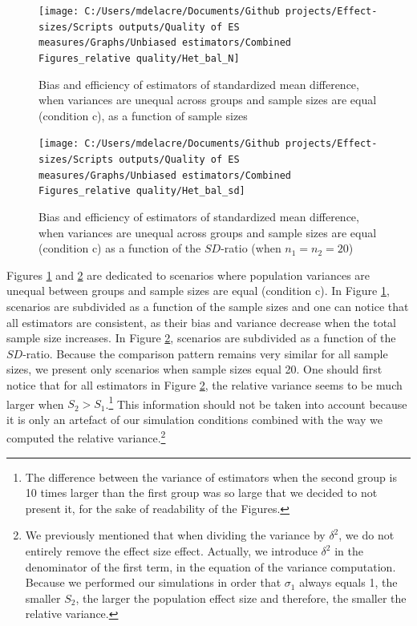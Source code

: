 \documentclass[
  english,
  man,floatsintext]{apa6}
\begin{document}
\begin{landscape}
\newpage

\begin{figure}

{\centering \texttt{[image: C:/Users/mdelacre/Documents/Github projects/Effect-sizes/Scripts outputs/Quality of ES measures/Graphs/Unbiased estimators/Combined Figures\_relative quality/Het\_bal\_N]} 

}

\caption{Bias and efficiency of estimators of standardized mean difference, when variances are unequal across groups and sample sizes are equal (condition c), as a function of sample sizes}\label{fig:idHetbal1}
\end{figure}

\end{landscape}
\newpage
\begin{landscape}

\begin{figure}

{\centering \texttt{[image: C:/Users/mdelacre/Documents/Github projects/Effect-sizes/Scripts outputs/Quality of ES measures/Graphs/Unbiased estimators/Combined Figures\_relative quality/Het\_bal\_sd]} 

}

\caption{Bias and efficiency of estimators of standardized mean difference, when variances are unequal across groups and sample sizes are equal (condition c) as a function of the $SD$-ratio (when $n_1=n_2=20$)}\label{fig:idHetbal2}
\end{figure}

\end{landscape}
\newpage

Figures \ref{fig:idHetbal1} and \ref{fig:idHetbal2} are dedicated to scenarios where population variances are unequal between groups and sample sizes are equal (condition c). In Figure \ref{fig:idHetbal1}, scenarios are subdivided as a function of the sample sizes and one can notice that all estimators are consistent, as their bias and variance decrease when the total sample size increases. In Figure \ref{fig:idHetbal2}, scenarios are subdivided as a function of the \(SD\)-ratio. Because the comparison pattern remains very similar for all sample sizes, we present only scenarios when sample sizes equal 20. One should first notice that for all estimators in Figure \ref{fig:idHetbal2}, the relative variance seems to be much larger when \(S_2>S_1\).\footnote{The difference between the variance of estimators when the second group is 10 times larger than the first group was so large that we decided to not present it, for the sake of readability of the Figures.} This information should not be taken into account because it is only an artefact of our simulation conditions combined with the way we computed the relative variance.\footnote{We previously mentioned that when dividing the variance by $\delta^2$, we do not entirely remove the effect size effect. Actually, we introduce $\delta^2$ in the denominator of the first term, in the equation of the variance computation. Because we performed our simulations in order that $\sigma_1$ always equals 1, the smaller $S_2$, the larger the population effect size and therefore, the smaller the relative variance.}
\end{document}
